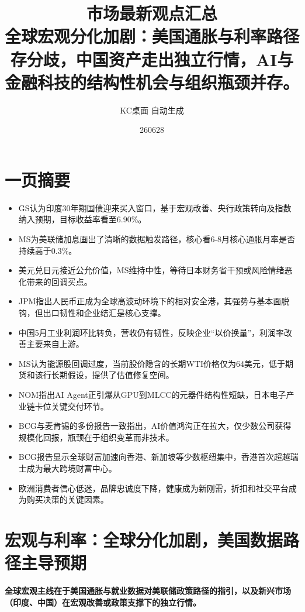 \documentclass[11pt]{ctexart}
\title{\textbf{市场最新观点汇总}\\[0.4em]{\large 全球宏观分化加剧：美国通胀与利率路径存分歧，中国资产走出独立行情，AI与金融科技的结构性机会与组织瓶颈并存。}}
\author{KC桌面 自动生成}
\date{260628}
\begin{document}
\maketitle
\tableofcontents
\newpage
\section{一页摘要}
\begin{itemize}
  \item GS认为印度30年期国债迎来买入窗口，基于宏观改善、央行政策转向及指数纳入预期，目标收益率看至6.90\%。
  \item MS为美联储加息画出了清晰的数据触发路径，核心看6-8月核心通胀月率是否持续高于0.3\%。
  \item 美元兑日元接近公允价值，MS维持中性，等待日本财务省干预或风险情绪恶化带来的回调买点。
  \item JPM指出人民币正成为全球高波动环境下的相对安全港，其强势与基本面脱钩，但出口韧性和企业结汇是核心支撑。
  \item 中国5月工业利润环比转负，营收仍有韧性，反映企业“以价换量”，利润率改善主要来自上游。
  \item MS认为能源股回调过度，当前股价隐含的长期WTI价格仅为64美元，低于期货和该行长期假设，提供了估值修复空间。
  \item NOM指出AI Agent正引爆从GPU到MLCC的元器件结构性短缺，日本电子产业链卡位关键交付环节。
  \item BCG与麦肯锡的多份报告一致指出，AI价值鸿沟正在拉大，仅少数公司获得规模化回报，瓶颈在于组织变革而非技术。
  \item BCG报告显示全球财富加速向香港、新加坡等少数枢纽集中，香港首次超越瑞士成为最大跨境财富中心。
  \item 欧洲消费者信心低迷，品牌忠诚度下降，健康成为新刚需，折扣和社交平台成为购买决策的关键因素。
\end{itemize}
\section{宏观与利率：全球分化加剧，美国数据路径主导预期}
\textbf{全球宏观主线在于美国通胀与就业数据对美联储政策路径的指引，以及新兴市场（印度、中国）在宏观改善或政策支撑下的独立行情。}
\end{document}
